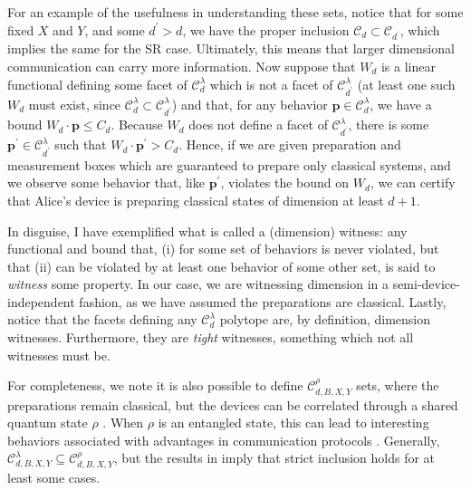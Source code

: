             For an example of the usefulness in understanding these sets, notice that for some fixed $X$ and $Y$, and some $d^\prime > d$, we have the proper inclusion $\mathcal{C}_{d} \subset \mathcal{C}_{d^\prime}$, which implies the same for the SR case. Ultimately, this means that larger dimensional communication can carry more information. Now suppose that $W_d$ is a linear functional defining some facet of $\mathcal{C}_{d}^\lambda$ which is not a facet of $\mathcal{C}_{d^\prime}^\lambda$ (at least one such $W_d$ must exist, since $\mathcal{C}_{d}^\lambda \subset \mathcal{C}_{d^\prime}^\lambda$) and that, for any behavior $\mathbf{p} \in \mathcal{C}_d^\lambda$, we have a bound $W_d \cdot \mathbf{p} \leq C_d$. Because $W_d$ does not define a facet of $\mathcal{C}_{d^\prime}^\lambda$, there is some $\mathbf{p}^\prime \in \mathcal{C}_{d^\prime}^\lambda$ such that $W_d \cdot \mathbf{p}^\prime > C_d$. Hence, if we are given preparation and measurement boxes which are guaranteed to prepare only classical systems, and we observe some behavior that, like $\mathbf{p}^\prime$, violates the bound on $W_d$, we can certify that Alice's device is preparing classical states of dimension at least $d+1$.
            
            In disguise, I have exemplified what is called a (dimension) witness: any functional and bound that, (i) for some set of behaviors is never violated, but that (ii) can be violated by at least one behavior of some other set, is said to \emph{witness} some property. In our case, we are witnessing dimension in a semi-device-independent fashion, as we have assumed the preparations are classical. Lastly, notice that the facets defining any $\mathcal{C}_d^\lambda$ polytope are, by definition, dimension witnesses. Furthermore, they are \emph{tight} witnesses, something which not all witnesses must be.
            
            For completeness, we note it is also possible to define $\mathcal{C}_{d,B,X,Y}^{\rho}$ sets, where the preparations remain classical, but the devices can be correlated through a shared quantum state $\rho$ \cite{tavakoli_eapam_2021,poderini_pamcriteria_2020}. When $\rho$ is an entangled state, this can lead to interesting behaviors associated with advantages in communication protocols \cite{pawlowski_earacs_2010}. Generally, $\mathcal{C}^\lambda_{d,B,X,Y} \subseteq \mathcal{C}^\rho_{d,B,X,Y}$, but the results in \cite{pawlowski_earacs_2010} imply that strict inclusion holds for at least some cases.

    
